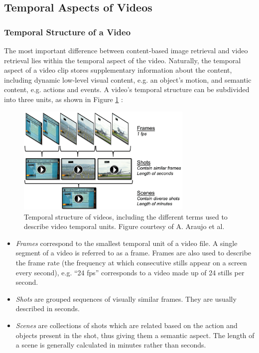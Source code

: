 
\subsection{Temporal Aspects of Videos}
\label{sec:temporal-aspect-videos}

\subsubsection{Temporal Structure of a Video}

The most important difference between content-based image retrieval and video retrieval lies within the temporal aspect of the video. Naturally, the temporal aspect of a video clip stores supplementary information about the content, including dynamic low-level visual content, e.g. an object's motion, and semantic content, e.g. actions and events. A video's temporal structure can be subdivided into three units, as shown in Figure \ref{fig:temporal_structure} \cite{araujo2017i2v}:

\begin{figure}[h]
\centerline{\includegraphics[width=0.75\textwidth]{figures/litsurvey/temporal_structure_videos.png}}
\caption{\label{fig:temporal_structure}Temporal structure of videos, including the different terms used to describe video temporal units. Figure courtesy of A. Araujo et al.}
\end{figure}

\begin{itemize}
    \item \textit{Frames} correspond to the smallest temporal unit of a video file. A single segment of a video is referred to as a frame. Frames are also used to describe the frame rate (the frequency at which consecutive stills appear on a screen every second), e.g. ``24 fps'' corresponds to a video made up of 24 stills per second.
    \item \textit{Shots} are grouped sequences of visually similar frames. They are usually described in seconds.
    \item \textit{Scenes} are collections of shots which are related based on the action and objects present in the shot, thus giving them a semantic aspect. The length of a scene is generally calculated in minutes rather than seconds.
\end{itemize}

